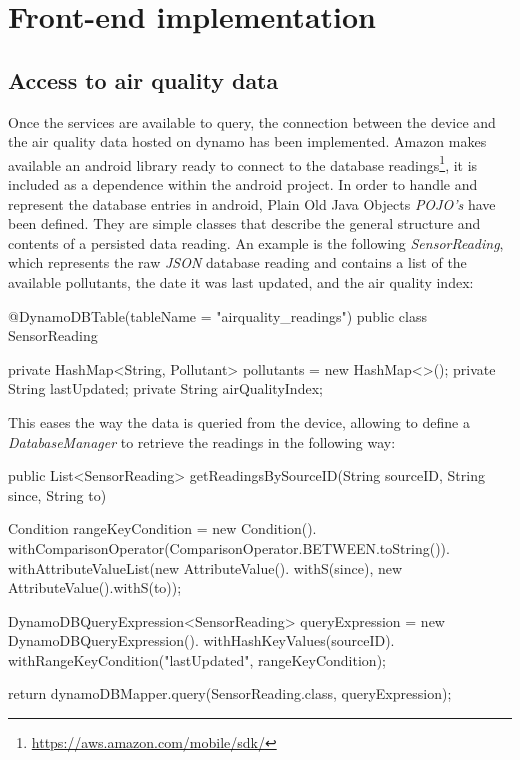 \section{Front-end implementation}
\subsection{Access to air quality data}
Once the services are available to query, the connection between the device and the air quality data hosted on dynamo has been implemented. Amazon makes available an android library ready to connect to the database readings\footnote{\url{https://aws.amazon.com/mobile/sdk/}}, it is included as a dependence within the android project. In order to handle and represent the database entries in android, Plain Old Java Objects \textit{POJO's} have been defined. They  are simple classes that describe the general structure and contents of a persisted data reading. An example is the following \textit{SensorReading}, which represents the raw \textit{JSON} database reading  and contains a list of the available pollutants, the date it was last updated, and the air quality index:

{\centering
\begin{spverbatim}

@DynamoDBTable(tableName = "airquality_readings")
public class SensorReading {

    private HashMap<String, Pollutant> pollutants = new HashMap<>();
    private String lastUpdated;
    private String airQualityIndex;
}
\end{spverbatim}
\par
}

This eases the way the data is queried from the device, allowing to define a \textit{DatabaseManager} to retrieve the readings in the following way: 

{\centering
\begin{spverbatim}
public List<SensorReading> getReadingsBySourceID(String sourceID, String since, String to) {

  Condition rangeKeyCondition = new Condition().
    withComparisonOperator(ComparisonOperator.BETWEEN.toString()).
    withAttributeValueList(new AttributeValue().
    withS(since), new AttributeValue().withS(to));

  DynamoDBQueryExpression<SensorReading> queryExpression = new
    DynamoDBQueryExpression().
    withHashKeyValues(sourceID).
    withRangeKeyCondition("lastUpdated", rangeKeyCondition);
  
return dynamoDBMapper.query(SensorReading.class, queryExpression);
}
\end{spverbatim}
\par
}

